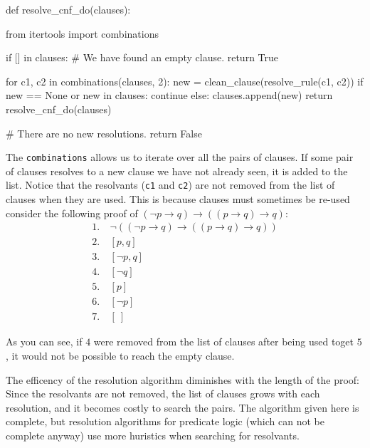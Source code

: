 \documentclass[a4paper,notitlepage]{scrartcl}
\begin{document}
\begin{code}

def resolve_cnf_do(clauses):

    from itertools import combinations

    if [] in clauses:
        # We have found an empty clause. 
        return True

    for c1, c2 in combinations(clauses, 2):
        new = clean_clause(resolve_rule(c1, c2))
        if new == None or new in clauses:
            continue
        else:
            clauses.append(new)
            return resolve_cnf_do(clauses)
    
    # There are no new resolutions.
    return False
\end{code}

The \texttt{combinations} allows us to iterate over all the pairs of 
   clauses.
If some pair of clauses resolves to a new clause we have not already
   seen, it is added to the list.
Notice that the resolvants (\texttt{c1} and \texttt{c2}) are not removed
   from the list of clauses when they are used.
This is because clauses must sometimes be re-used consider the following
   proof of $(\lnot p\rightarrow q)\rightarrow ((p\rightarrow q)\rightarrow
   q)$:
\begin{align*}
1.\ & \lnot((\lnot p\rightarrow q)\rightarrow ((p\rightarrow q)\rightarrow q))
   \tag{negated for resolution proof}\\
2.\ & [p, q] \tag{clausal cnf}\\
3.\ & [\lnot p, q] \tag{clausal cnf}\\
4.\ & [\lnot q]  \tag{clausal cnf}\\
5.\ & [p] \tag{resolution rule on 2, 4}\\
6.\ & [\lnot p] \tag{resolution rule on 3, 4}\\
7.\ & [\ ] \tag{resolution rule on 5, 6}
\end{align*}

As you can see, if $4$ were removed from the list of clauses after being
   used toget $5$, it would not be possible to reach the empty clause.

The efficency of the resolution algorithm diminishes with the length
   of the proof: 
Since the resolvants are not removed, the list of clauses grows with
   each resolution, and it becomes costly to search the pairs.
The algorithm given here is complete, but resolution algorithms for
   predicate logic (which can not be complete anyway)
   use more huristics when searching for resolvants.
\end{document}
